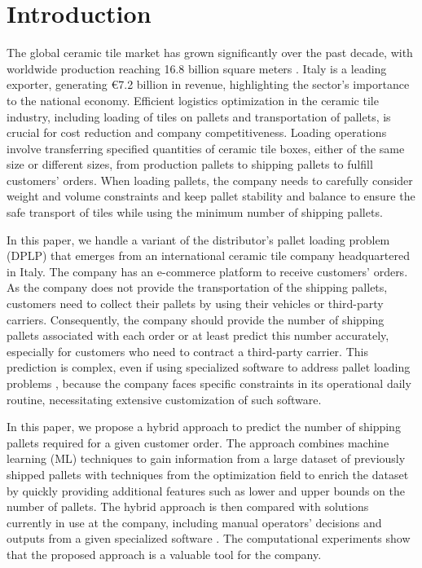 \documentclass[runningheads]{llncs}
\newcommand{\rev}[1]{{#1}}
\begin{document}
\section{Introduction}
The global ceramic tile market has grown significantly over the past decade, with worldwide production reaching 16.8 billion square meters \cite{mecs2023}. Italy is a leading exporter, generating €7.2 billion in revenue, highlighting the sector's importance to the national economy. %
\rev{Efficient logistics optimization in the ceramic tile industry, including loading of tiles on pallets and transportation of pallets,} is crucial for cost reduction and company competitiveness. Loading operations involve transferring specified quantities of ceramic tile boxes, either of the same size or different sizes, from production pallets to shipping pallets to fulfill customers' orders. When loading pallets, the company needs to carefully consider weight and volume constraints and keep pallet stability and balance to ensure the safe transport of tiles while using the minimum number of shipping pallets.

In this paper, we handle a variant of the distributor's pallet loading problem (DPLP) \cite{Mungwattana2023} that emerges from an international ceramic tile company headquartered in Italy. The company has an e-commerce platform to receive customers' orders. As the company does not provide the transportation of the shipping pallets, customers need to collect their pallets by using their vehicles or third-party carriers. Consequently, the company should provide the number of shipping pallets associated with each order or at least predict this number accurately, especially for customers who need to contract a third-party carrier. This prediction is complex, even if using specialized software to address pallet loading problems \cite{Silva2016}, because the company faces specific constraints in its operational daily routine, necessitating extensive customization of such software. 

\rev{In this paper, we propose a hybrid approach to predict the number of shipping pallets required for a given customer order. The approach combines machine learning (ML) techniques to gain information from a large dataset of previously shipped pallets with techniques from the optimization field to enrich the dataset by quickly providing additional features such as lower and upper bounds on the number of pallets. The hybrid approach is then compared with solutions currently in use at the company, including manual operators' decisions and outputs from a given specialized software \cite{packvol}. The computational experiments show that the proposed approach is a valuable tool for the company.}
\end{document}
